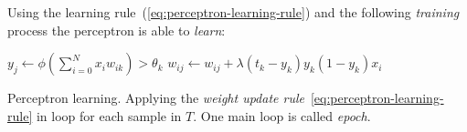 Using the learning rule~(\ref{eq:perceptron-learning-rule}) and the following \emph{training} process the perceptron is able to \emph{learn}: 
\begin{algorithm}[H]
  \begin{algorithmic}
        \State $y_j \gets \phi(\sum_{i=0}^N x_iw_{ik}) > \theta_k$
          \State $w_{ij} \gets w_{ij} + \lambda (t_k - y_k)y_k(1 - y_k)x_i$
        \EndFor
      \EndFor
    \EndFor
  \end{algorithmic}
  \caption{Perceptron learning. Applying the \emph{weight update rule}~\ref{eq:perceptron-learning-rule} in loop for each sample in $T$. One main loop is called \emph{epoch}.}  
  \label{alg:perceptron-learning}
\end{algorithm} 


